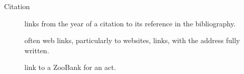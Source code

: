 \begin{description}
    \item[\textcolor{citelinkcolour}{Citation}] links from the year of
        a citation to its reference in the bibliography.
    \item[\textallsc{\textcolor{urllinkcolour}{URL}}] often web links,
        particularly to websites,  links,  with
        the address fully written.
    \item[{\upshape{}}] link to a ZooBank  for an act.
\end{description}
